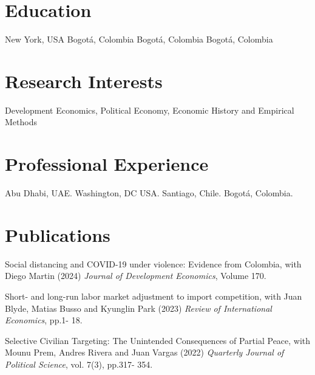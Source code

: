 \documentclass{moderncv}
\begin{document}
\maketitle
\section{\textbf{Education}}
 {New York, USA}{}{}
 {Bogot\'a, Colombia}{}{}
 {Bogot\'a, Colombia}{}{}
 {Bogot\'a, Colombia}{}{}

\section{\textbf{Research Interests}}
{Development Economics,  Political Economy,  Economic History and Empirical Methods }

\section{\textbf{Professional Experience}}
 {}{}{Abu Dhabi, UAE.}
 {}{}{Washington, DC USA.}
 {}{}{Santiago, Chile.}
 {}{}{Bogot\'a, Colombia.}

\section{\textbf{Publications}}

{Social distancing and COVID-19 under violence: Evidence from Colombia, with Diego Martin (2024) \emph{Journal of Development Economics}, Volume 170. \\}

{Short- and long-run labor market adjustment to import competition, with Juan Blyde, Matias Busso and Kyunglin Park (2023) \emph{Review of International Economics}, pp.1- 18. \\}

{Selective Civilian Targeting: The Unintended Consequences of Partial Peace, with Mounu Prem, Andres Rivera and Juan Vargas (2022) \emph{Quarterly Journal of Political Science}, vol. 7(3), pp.317- 354. \\}
\end{document}
